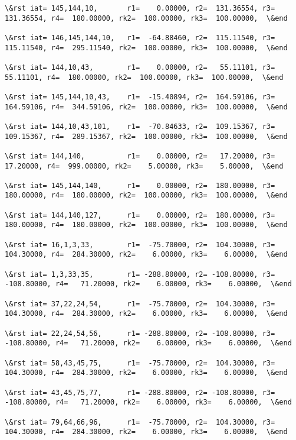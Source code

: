 \documentclass[11pt]{article}
\begin{document}
\begin{Verbatim}[commandchars=\\\{\}]
\&rst iat= 145,144,10,       r1=    0.00000, r2=  131.36554, r3=  131.36554, r4=  180.00000, rk2=  100.00000, rk3=  100.00000,  \&end

\&rst iat= 146,145,144,10,   r1=  -64.88460, r2=  115.11540, r3=  115.11540, r4=  295.11540, rk2=  100.00000, rk3=  100.00000,  \&end

\&rst iat= 144,10,43,        r1=    0.00000, r2=   55.11101, r3=   55.11101, r4=  180.00000, rk2=  100.00000, rk3=  100.00000,  \&end

\&rst iat= 145,144,10,43,    r1=  -15.40894, r2=  164.59106, r3=  164.59106, r4=  344.59106, rk2=  100.00000, rk3=  100.00000,  \&end

\&rst iat= 144,10,43,101,    r1=  -70.84633, r2=  109.15367, r3=  109.15367, r4=  289.15367, rk2=  100.00000, rk3=  100.00000,  \&end

\&rst iat= 144,140,          r1=    0.00000, r2=   17.20000, r3=   17.20000, r4=  999.00000, rk2=    5.00000, rk3=    5.00000,  \&end

\&rst iat= 145,144,140,      r1=    0.00000, r2=  180.00000, r3=  180.00000, r4=  180.00000, rk2=  100.00000, rk3=  100.00000,  \&end

\&rst iat= 144,140,127,      r1=    0.00000, r2=  180.00000, r3=  180.00000, r4=  180.00000, rk2=  100.00000, rk3=  100.00000,  \&end

\&rst iat= 16,1,3,33,        r1=  -75.70000, r2=  104.30000, r3=  104.30000, r4=  284.30000, rk2=    6.00000, rk3=    6.00000,  \&end

\&rst iat= 1,3,33,35,        r1= -288.80000, r2= -108.80000, r3= -108.80000, r4=   71.20000, rk2=    6.00000, rk3=    6.00000,  \&end

\&rst iat= 37,22,24,54,      r1=  -75.70000, r2=  104.30000, r3=  104.30000, r4=  284.30000, rk2=    6.00000, rk3=    6.00000,  \&end

\&rst iat= 22,24,54,56,      r1= -288.80000, r2= -108.80000, r3= -108.80000, r4=   71.20000, rk2=    6.00000, rk3=    6.00000,  \&end

\&rst iat= 58,43,45,75,      r1=  -75.70000, r2=  104.30000, r3=  104.30000, r4=  284.30000, rk2=    6.00000, rk3=    6.00000,  \&end

\&rst iat= 43,45,75,77,      r1= -288.80000, r2= -108.80000, r3= -108.80000, r4=   71.20000, rk2=    6.00000, rk3=    6.00000,  \&end

\&rst iat= 79,64,66,96,      r1=  -75.70000, r2=  104.30000, r3=  104.30000, r4=  284.30000, rk2=    6.00000, rk3=    6.00000,  \&end


\end{Verbatim}
\end{document}
